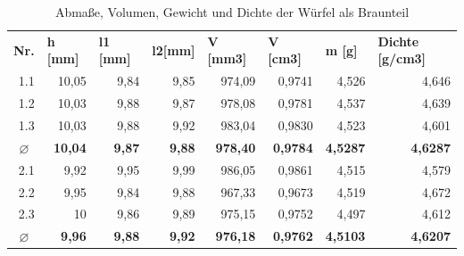   \FloatBarrier
  \begin{table}[h]
    \centering
    \caption{Abmaße, Volumen, Gewicht und Dichte der Würfel als Braunteil}
      \begin{tabular}{crrrrrrr}
      \toprule
      \textbf{Nr.} & \multicolumn{1}{l}{\textbf{h [mm]}} & \multicolumn{1}{l}{\textbf{l1 [mm]}} & \multicolumn{1}{l}{\textbf{l2[mm]}} & \multicolumn{1}{l}{\textbf{V [mm3]}} & \multicolumn{1}{l}{\textbf{V [cm3]}} & \multicolumn{1}{l}{\textbf{m [g]}} & \multicolumn{1}{l}{\textbf{Dichte [g/cm3]}} \\
      \multicolumn{1}{r}{1.1} & 10,05 & 9,84 & 9,85  & 974,09 & 0,9741 & 4,526 & 4,646 \\
      \multicolumn{1}{r}{1.2} & 10,03 & 9,88 & 9,87  & 978,08 & 0,9781 & 4,537 & 4,639 \\
      \multicolumn{1}{r}{1.3} & 10,03 & 9,88 & 9,92 & 983,04 & 0,9830 & 4,523  & 4,601 \\
      \textbf{\textbf{$\varnothing$}} & \textbf{10,04} & \textbf{9,87} & \textbf{9,88} & \textbf{978,40} & \textbf{0,9784} & \textbf{4,5287} & \textbf{4,6287} \\
      \midrule
      \multicolumn{1}{r}{2.1} & 9,92  & 9,95 & 9,99 & 986,05 & 0,9861 & 4,515 & 4,579 \\
      \multicolumn{1}{r}{2.2} & 9,95 & 9,84  & 9,88 & 967,33 & 0,9673 & 4,519 & 4,672 \\
      \multicolumn{1}{r}{2.3} & 10  & 9,86 & 9,89 & 975,15 & 0,9752 & 4,497 & 4,612 \\
      \textbf{\textbf{$\varnothing$}} & \textbf{9,96} & \textbf{9,88} & \textbf{9,92} & \textbf{976,18} & \textbf{0,9762} & \textbf{4,5103} & \textbf{4,6207} \\
      \bottomrule
      \end{tabular}%
    \label{Braunteilmaße}%
  \end{table}%
  \FloatBarrier

